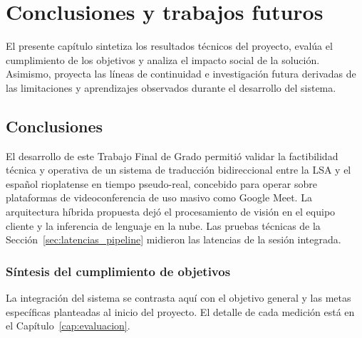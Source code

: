 \chapter{Conclusiones y trabajos futuros}
\label{cap:conclusiones_y_trabajos_futuros}

El presente capítulo sintetiza los resultados técnicos del proyecto, evalúa el cumplimiento de los objetivos y analiza el impacto social de la solución. Asimismo, proyecta las líneas de continuidad e investigación futura derivadas de las limitaciones y aprendizajes observados durante el desarrollo del sistema.

\section{Conclusiones}
\label{sec:conclusiones}

El desarrollo de este Trabajo Final de Grado permitió validar la factibilidad técnica y operativa de un sistema de traducción bidireccional entre la LSA y el español rioplatense en tiempo pseudo-real, concebido para operar sobre plataformas de videoconferencia de uso masivo como Google Meet. La arquitectura híbrida propuesta dejó el procesamiento de visión en el equipo cliente y la inferencia de lenguaje en la nube. Las pruebas técnicas de la Sección~\ref{sec:latencias_pipeline} midieron las latencias de la sesión integrada.

\subsection{Síntesis del cumplimiento de objetivos}

La integración del sistema se contrasta aquí con el objetivo general y las metas específicas planteadas al inicio del proyecto. El detalle de cada medición está en el Capítulo~\ref{cap:evaluacion}.

